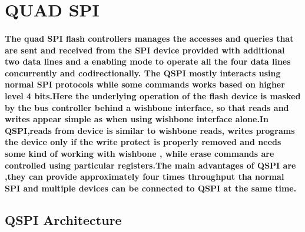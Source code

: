 \documentclass[12pt,a4paper]{report}
\begin{document}
\section{QUAD SPI}
\paragraph{\textrm{\textmd{ The quad SPI flash controllers manages the accesses and queries that are sent and received from the SPI device provided with additional two data lines and a enabling mode to operate all the four data lines concurrently and codirectionally. The QSPI mostly interacts using normal SPI protocols while some commands works based on higher level 4 bits.Here the underlying operation of the flash device is masked by the bus controller behind a wishbone interface, so that reads and writes appear simple as when using wishbone interface alone.In QSPI,reads from device is similar to wishbone reads, writes programs the device only if the write protect is properly removed and needs some kind of working with wishbone , while erase commands are controlled using particular registers.The main advantages of QSPI are ,they can provide approximately four times throughput tha normal SPI and multiple devices can be connected to QSPI at the same time.}}}


\subsection{QSPI Architecture}
\end{document}
